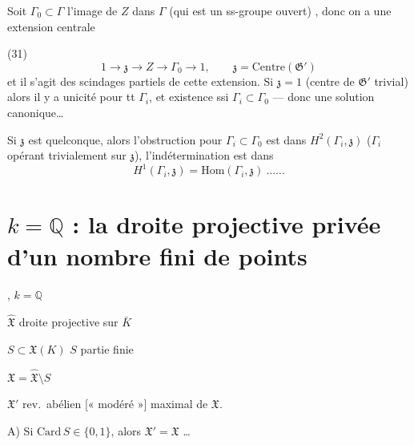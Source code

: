 \documentclass[11pt,a4paper]{article}
\begin{document}

Soit $\Gamma_0 \subset \Gamma$ l'image de $Z$ dans $\Gamma$ (qui est un ss-groupe ouvert) , donc on a une extension centrale

(31)
\[
  1 \to \mathfrak{z} \to Z \to \Gamma_0 \to 1 , \qquad \mathfrak{z} = \mathrm{Centre}(\mathfrak{G}')
\]
et il s'agit des scindages partiels de cette extension. Si $\mathfrak{z} = 1$ (centre de $\mathfrak{G}'$ trivial) alors il y a unicité pour tt $\Gamma_i$, et existence ssi $\Gamma_i \subset \Gamma_0$ --- donc une solution canonique\ldots

Si $\mathfrak{z}$ est quelconque, alors l'obstruction pour $\Gamma_i \subset \Gamma_0$  est dans $H^2(\Gamma_i, \mathfrak{z})$ ($\Gamma_i$ opérant trivialement sur $\mathfrak{z}$), l'indétermination est dans
\[
  H^1(\Gamma_i, \mathfrak{z}) = \mathrm{Hom}(\Gamma_i, \mathfrak{z}) \ \ldots\ldots
\]

\section{$k = \mathbb{Q}$ : la droite projective privée d'un nombre fini de points}


, $k = \mathbb{Q}$

$\hat{\mathfrak{X}}$ droite projective sur $\bar{K}$ 

$S \subset \mathfrak{X}(K)$ \quad $S$ partie finie

$\mathfrak{X} = \hat{\mathfrak{X}} \setminus S$

$\mathfrak{X}'$ rev.\ abélien [« modéré »] maximal de $\mathfrak{X}$.

A) Si $\mathrm{Card}\, S \in \{0,1\}$, alors $\mathfrak{X}' = \mathfrak{X}$ \ldots
\end{document}
